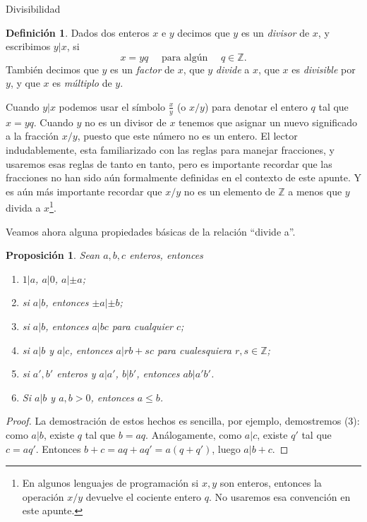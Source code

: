 \documentclass[11pt,spanish,makeidx]{amsbook}
\newtheorem{proposicion}[teorema]{Proposici\'on}
\theoremstyle{definition}
\newtheorem{definicion}{Definici\'on}[section]
\theoremstyle{remark}
\begin{document}
\begin{section}{Divisibilidad}\label{1.6}

\begin{definicion}Dados dos enteros $x$ e $y$ decimos que $y$ es un {\em divisor} de $x$, y escribimos $y|x$, si
$$
x=yq\quad\text{ para algún }\quad q\in \mathbb Z.
$$
También decimos que $y$ es un {\em factor} de $x$, que $y$ {\em divide} a $x$, que $x$ es {\em divisible} por $y$, y que $x$ es {\em múltiplo} de $y$.
\end{definicion}

Cuando $y|x$ podemos usar el símbolo $\frac{x}{y}$ (o $x/y$) para denotar el entero $q$ tal que $ x=yq$. Cuando $y$ no es un divisor de $x$ tenemos que asignar un nuevo significado a la fracción $x/y$, puesto que este número no es un entero. El lector indudablemente, esta familiarizado con las reglas para manejar fracciones, y usaremos esas reglas de tanto en tanto, pero es importante recordar que las fracciones no han sido aún formalmente definidas en el contexto de este apunte. Y es aún más importante recordar que $x/y$ no es un elemento de $\mathbb Z$ a menos que $y$ divida a $x$\footnote{En algunos lenguajes de programación si $x,y$ son enteros, entonces la operación $x/y$ devuelve el cociente entero $q$. No usaremos esa convención en este apunte.}.

Veamos ahora alguna propiedades básicas de la relación ``divide a''. 

\begin{proposicion}\label{prop-divide-a-propiedades}Sean $a,b,c$ enteros, entonces
\begin{enumerate}%
\item $1|a$, $a|0$, $a|\pm a$;
\item si $a|b$, entonces $\pm a| \pm b$;
\item si $a|b$, entonces $a|bc$ para cualquier $c$;
\item si $a|b$ y $a|c$, entonces $a|rb+sc$ para cualesquiera $r,s \in \mathbb Z$;
\item\label{prop-divide-a-propiedades-item-5} si $a',b'$ enteros y $a|a'$, $b|b'$, entonces $ab|a'b'$.
\item\label{prop-divide-a-propiedades-item-6} Si $a|b$ y $a,b>0$,  entonces $a \le b$.
\end{enumerate}
\end{proposicion}
\begin{proof}
	La demostración de estos hechos es sencilla, por ejemplo, demostremos (3): como $a|b$, existe $q$ tal que $b = aq$. Análogamente, como $a|c$, existe $q'$ tal que $c = aq'$. Entonces $b+c = aq+aq' = a(q+q')$, luego $a|b+c$.  


\end{proof}
\end{section}
\end{document}
